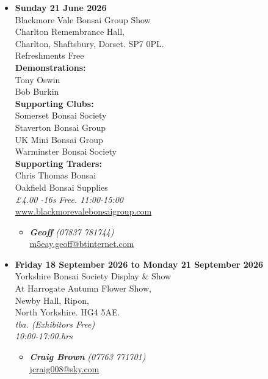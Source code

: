 \begin{itemize}
    \item \textbf{Sunday 21 June 2026}
    \\
    Blackmore Vale Bonsai Group Show \\
    Charlton Remembrance Hall, \\
    Charlton, Shaftsbury, Dorset. SP7 0PL. \\
    Refreshments Free \\
    \textbf{Demonstrations:} \\
    Tony Oswin \\
    Bob Burkin \\
    \textbf{Supporting Clubs:} \\
    Somerset Bonsai Society \\
    Staverton Bonsai Group \\
    UK Mini Bonsai Group \\
    Warminster Bonsai Society \\
    \textbf{Supporting Traders:} \\
    Chris Thomas Bonsai \\
    Oakfield Bonsai Supplies
    \\
    \emph{£4.00 -16s Free. 11:00-15:00}
    \\
    \href{https://www.blackmorevalebonsaigroup.com}{www.blackmorevalebonsaigroup.com}
    \begin{itemize}
        \item \textbf{\emph{Geoff}} \emph{(07837 781744)} \\
        \href{mailto:m5eay.geoff@btinternet.com}{m5eay.geoff@btinternet.com} 
    \end{itemize}

    \item \textbf{Friday 18 September 2026 to Monday 21 September 2026}
    \\
    Yorkshire Bonsai Society Display \& Show \\
    At Harrogate Autumn Flower Show, \\
    Newby Hall, Ripon, \\
    North Yorkshire. HG4 5AE.
    \\
    \emph{tba. (Exhibitors Free)} \\
    \emph{10:00-17:00.hrs}
    \begin{itemize}
        \item \textbf{\emph{Craig Brown}} \emph{(07763 771701)} \\
        \href{mailto:jcraig008@sky.com}{jcraig008@sky.com} 
    \end{itemize}


\end{itemize}
